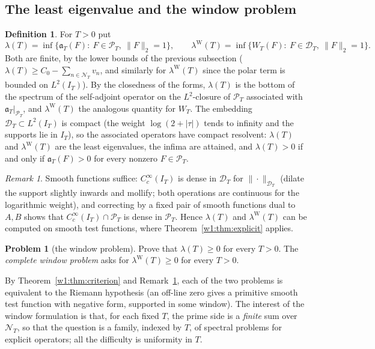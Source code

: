 \documentclass[11pt]{amsart}
\theoremstyle{definition}
\newtheorem{definition}[theorem]{Definition}
\newtheorem{problem}[theorem]{Problem}
\theoremstyle{remark}
\newtheorem{remark}[theorem]{Remark}
\numberwithin{equation}{section}
\newcommand{\IT}{I_T}                                  %
\newcommand{\PT}{\mathcal{P}_T}                        %
\newcommand{\DT}{\mathcal{D}_T}                        %
\newcommand{\NT}{\mathcal{N}_T}                        %
\newcommand{\aT}{\mathfrak{a}_T}                       %
\newcommand{\WT}{W_T}                                  %
\newcommand{\lam}{\lambda(T)}                          %
\newcommand{\lamW}{\lambda^{\mathrm W}(T)}             %
\begin{document}
\subsection{The least eigenvalue and the window problem}
\begin{definition}\label{w1:def:lambda}
For $T>0$ put
\[
  \lam=\inf\{\aT(F):\ F\in\PT,\ \|F\|_2=1\},\qquad
  \lamW=\inf\{\WT(F):\ F\in\DT,\ \|F\|_2=1\}.
\]
Both are finite, by the lower bounds of the previous subsection
($\lam\ge C_0-\sum_{n\in\NT}v_n$, and similarly for $\lamW$ since the polar term
is bounded on $L^2(\IT)$). By the closedness of the forms, $\lam$ is the
bottom of the spectrum of the self-adjoint operator on the $L^2$-closure of
$\PT$ associated with $\aT|_{\PT}$, and $\lamW$ the analogous quantity for
$\WT$. The embedding $\DT\subset L^2(\IT)$ is compact (the weight
$\log(2+|\tau|)$ tends to infinity and the supports lie in $\IT$), so the
associated operators have compact resolvent: $\lam$ and $\lamW$ are the least
eigenvalues, the infima are attained, and $\lam>0$ if and only if $\aT(F)>0$
for every nonzero $F\in\PT$.
\end{definition}

\begin{remark}\label{w1:rem:density}
Smooth functions suffice: $C_c^\infty(\IT)$ is dense in $\DT$ for
$\|\cdot\|_{\DT}$ (dilate the support slightly inwards and mollify; both
operations are continuous for the logarithmic weight), and correcting by a
fixed pair of smooth functions dual to $A,B$ shows that $C_c^\infty(\IT)\cap\PT$
is dense in $\PT$. Hence $\lam$ and $\lamW$ can be computed on smooth test
functions, where Theorem~\ref{w1:thm:explicit} applies.
\end{remark}

\begin{problem}[the window problem]\label{w1:prob:window}
Prove that $\lam\ge0$ for every $T>0$. The \emph{complete window problem}
asks for $\lamW\ge0$ for every $T>0$.
\end{problem}

By Theorem~\ref{w1:thm:criterion} and Remark~\ref{w1:rem:density}, each of the
two problems is equivalent to the Riemann hypothesis (an off-line zero gives
a primitive smooth test function with negative form, supported in some
window). The interest of the window formulation is that, for each fixed $T$,
the prime side is a \emph{finite} sum over $\NT$, so that the question is a
family, indexed by $T$, of spectral problems for explicit operators; all the
difficulty is uniformity in $T$.
\end{document}
